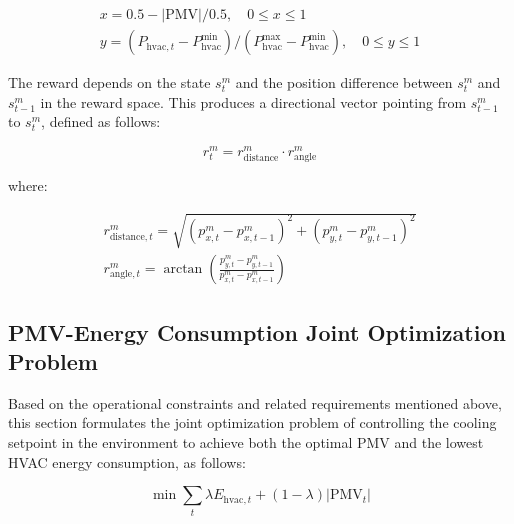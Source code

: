 \documentclass[preprint,12pt]{elsarticle}
\begin{document}
\begin{equation}
    \begin{gathered}
        x = 0.5 - |\text{PMV}| / 0.5, \quad 0 \leq x \leq 1 \\
        y = (P_{\text{hvac},t} - P_{\text{hvac}}^{\min}) / (P_{\text{hvac}}^{\max} - P_{\text{hvac}}^{\min}), \quad 0 \leq y \leq 1
    \end{gathered}
\end{equation}

The reward depends on the state $s_t^m$ and the position difference between $s_t^m$ 
and $s_{t-1}^m$ in the reward space. This produces a directional vector pointing from $s_{t-1}^m$ 
to $s_t^m$, defined as follows:

\begin{equation}
    r_t^m = r_{\text{distance}}^m \cdot r_{\text{angle}}^m
\end{equation}

where:

\begin{equation}
    \begin{gathered}
        r_{\text{distance},t}^m = \sqrt{(p_{x,t}^m - p_{x,t-1}^m)^2 + (p_{y,t}^m - p_{y,t-1}^m)^2} \\
        r_{\text{angle},t}^m = \arctan\left(\frac{p_{y,t}^m - p_{y,t-1}^m}{p_{x,t}^m - p_{x,t-1}^m}\right)
    \end{gathered}
\end{equation}


\subsection{PMV-Energy Consumption Joint Optimization Problem}

Based on the operational constraints and related requirements mentioned above, this section 
formulates the joint optimization problem of controlling the cooling setpoint in the environment to 
achieve both the optimal PMV and the lowest HVAC energy consumption, as follows:

\begin{equation}
\min \sum_{t} \lambda E_{\text{hvac},t} + (1 - \lambda) |\text{PMV}_t|
\end{equation}
\end{document}
